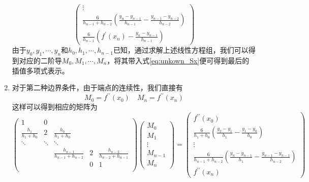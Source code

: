 \begin{enumerate}
\begin{equation}
\begin{pmatrix}
					\vdots	\\
					\frac{6}{h_{n-1} + h_{n-2}}\left(\frac{y_n-y_{n-1}}{h_{n-1}} - \frac{y_{n-1} - y_{n-2}}{h_{n-2}}\right) \\
					\frac{6}{h_{n-1}}\left(f^{\prime}(x_n) - \frac{y_{n}-y_{n-1}}{h_{n-1}} \right)
				\end{pmatrix}
			\end{equation}
			由于$y_0, y_1, \cdots, y_n$和$h_0, h_1, \cdots, h_{n-1}$已知，通过求解上述线性方程组，我们可以得到对应的二阶导$M_0, M_1, \cdots, M_n$，将其带入式\eqref{eq:unkown_Sx}便可得到最后的插值多项式表示。
		\item 对于第二种边界条件，由于端点的连续性，我们直接有
			\begin{equation}
				M_0 = f^{\prime\prime}(x_0)	\quad M_n = f^{\prime\prime}(x_n)
			\end{equation} 
			这样可以得到相应的矩阵为
			\begin{equation}
			    \begin{pmatrix}
					1						&	0	&	~						&	~	&	~\\
					\frac{h_1}{h_1 + h_{0}}	&	2	&	\frac{h_0}{h_1 + h_0}	&	~	&	~\\
					\ddots	&	\ddots		&	\ddots	&	~	&	~\\
					~		&	~			&	\frac{h_{n-1}}{h_{n-1}+h_{n-2}}	&	2	&	\frac{h_{n-2}}{h_{n-2} + h_{n-1}}\\
					~		&	~			&	~	&	0	&	1\\
			    \end{pmatrix}
				\begin{pmatrix}
					M_0		\\
					M_1		\\	
					\vdots	\\
					M_{n-1}	\\
					M_{n}	
				\end{pmatrix}
				=
				\begin{pmatrix}
					f^{\prime\prime}(x_0)	\\
					\frac{6}{h_1 + h_0}\left(\frac{y_2-y_1}{h_1} - \frac{y_1 - y_0}{h_{0}}\right)	\\
					\vdots	\\
					\frac{6}{h_{n-1} + h_{n-2}}\left(\frac{y_n-y_{n-1}}{h_1} - \frac{y_{n-1} - y_{n-1}}{h_{n-2}}\right) \\
					f^{\prime\prime}(x_n)
				\end{pmatrix}
			\end{equation} 
	\end{enumerate}
	
